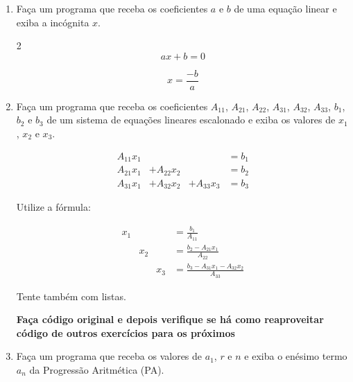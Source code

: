 \begin{enumerate}
	
	
	\item Faça um programa que receba os coeficientes $a$ e $b$ de uma equação linear e exiba a incógnita $x$.
	
	\begin{multicols}{2}
		\begin{equation*}
			ax + b = 0
		\end{equation*} 
		
		\begin{equation*}
			x = \frac{-b}{a}
		\end{equation*}
	\end{multicols}	
	
\quebra	

	\item Faça um programa que receba os coeficientes $A_{11}$, $A_{21}$, $A_{22}$, $A_{31}$, $A_{32}$, $A_{33}$, $b_1$, $b_2$ e $b_3$ de um sistema de equações lineares escalonado e exiba os valores de $x_1$, $x_2$ e $x_3$.
	
		\begin{align*}
			A_{11} x_1 & & &= b_1 	\\
			A_{21} x_1 &+ A_{22} x_2 & &= b_2 		\\
			A_{31} x_1 &+ A_{32} x_2 &+ A_{33} x_3 &= b_3 
		\end{align*}
		
\quebra		Utilize a fórmula:
		
		\begin{align*}
			x_1 & & &= \frac{b_1}{A_{11}} 	
			\\ & x_2 & &= \frac{b_2 - A_{21} x_1}{A_{22}} 		
			\\ & & x_3 &= \frac{b_3 - A_{31} x_1 - A_{32} x_2}{A_{33}}
		\end{align*}

		Tente também com listas.	
		
\quebra		

	\textbf{Faça código original e depois verifique se há como reaproveitar código de outros exercícios para os próximos}
	
	\item Faça um programa que receba os valores de $a_1$, $r$ e $n$ e exiba o enésimo termo $a_n$ da Progressão Aritmética (PA).
	

\end{enumerate}
